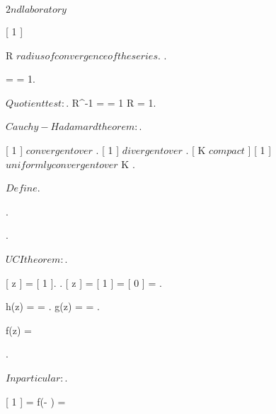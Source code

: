 \documentclass[../Main/main]{subfiles}
\begin{document}
\renewcommand{\blockName}{ Martin Azpillaga }
\unit{ $ 2nd laboratory $ }
{
	{
		\study
		{
			[ 1 ]
		}
		\demonstration
		{
			{
				R $ radius of convergence of the series $.
				{
				}
			}.

			{
				 =  = 1.

				$Quotient test:$.
				R^{-1} =  = 1 \imp R = 1.

				$Cauchy-Hadamard theorem:$.

				[ 1 ] $ convergent over $ \D.
				[ 1 ] $ divergent  over $ \C \setminus \closed{\D}.
				[ K $ compact $ ]
				{
					[ 1 ] $ uniformly convergent over $  K
				}.

				$ Define $.

			}.


			{
				.

				$UCI theorem:$.

				[ z ] = [ 1 ].
				.
				[ z ] =  [ 1 ] = [ 0 ] = .

				h(z) =  = .
				g(z) =  = .

				f(z) = 
			}.


			{
				$In particular:$.

				[ 1 ] = f(- ) = 
			}
		}
	}
	
}
\end{document}
